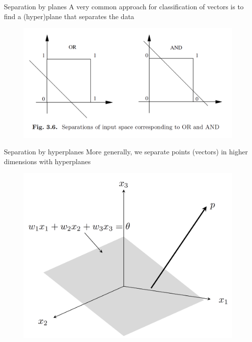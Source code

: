 \documentclass{beamer}
\begin{document}
\begin{frame}{Separation by planes}
A very common approach for classification of vectors is to find a (hyper)plane that separates the data
	\begin{figure}[h]
		\centering
		\includegraphics[scale=0.5]{Figures/nn_3.6.png}
	\end{figure}
	
	
\end{frame}


\begin{frame}{Separation by hyperplanes}
More generally, we separate points (vectors) in higher dimensions with hyperplanes

\begin{figure}[h]
	\centering
	\includegraphics[scale=0.25]{Figures/plane_figure.png}
\end{figure}

\end{frame}
\end{document}
